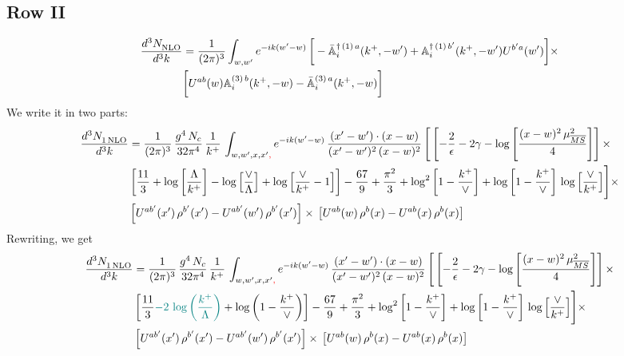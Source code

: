 \documentclass[9pt]{article}
\def\mf#1{\mathbb{#1}}
\numberwithin{equation}{section}
\begin{document}
\subsection{Row II}
\begin{align}
    \frac{d^{3}N_{\rm NLO}^{\rm}}{d^{3}k} &  = \frac{1}{(2\pi)^{3}}  \int_{w, w^\prime} e^{-ik(w^\prime-w)}\,\bigg[-\bar{\mf{A}}^{\dagger\,(1)\,a}_{i}(k^{+},-w^{\prime})+\mf{A}^{\dagger\, (1)\, b^{\prime}}_{i}(k^{+},-w^{\prime})U^{b^{\prime}a}(w^{\prime})\bigg]\times \notag \\ & \bigg[U^{ab}(w)\mf{A}^{(3)\, b}_{i}(k^{+},- w)-\Bar{\mf{A}}^{(3)\, a}_{i}(k^{+}, - w)\bigg]\nonumber
\end{align}
We write it in two parts: 
\begin{align}
     \frac{d^{3}N_{1\,\rm NLO}^{\rm}}{d^{3}k} &  = \frac{1}{(2\pi)^{3}}\, \frac{g^{4}\,N_{c}}{32\pi^{4}}\,\frac{1}{k^{+}}\, \int_{w, w',x,x'{\color{red},}} e^{-ik(w^\prime-w)}\, \frac{(x'-w')\cdot (x-w)}{(x'-w')^{2}\, (x-w)^{2}}\, \Bigg[\left[-\frac{2}{\epsilon}-2\gamma-\log{\left[\frac{(x-w)^{2}\,\mu^{2}_{\overline{MS}}}{4}\right]}\right]\times \notag \\ & \left[\frac{11}{3}+\log{\left[\frac{\Lambda}{k^{+}}\right]}-\log{\left[\frac{\vee}{\Lambda}\right]}+\log{\left[\frac{\vee}{k^{+}}-1\right]}\right]-\frac{67}{9}+\frac{\pi^{2}}{3}+\log^{2}{\left[1-\frac{k^{+}}{\vee}\right]}+\log{\left[1-\frac{k^{+}}{\vee}\right]}\,\log{\left[\frac{\vee}{k^{+}}\right]}\Bigg]\times\notag \\ & \left[U^{ab'}(x')\,\rho^{b'}(x') - U^{ab'}(w')\,\rho^{b'}(x')\right]\times\,\left[U^{ab}(w)\,\rho^{b}(x) - U^{ab}(x)\,\rho^{b}(x)\right]
\end{align}
Rewriting, we get
\begin{align}
     \frac{d^{3}N_{1\,\rm NLO}^{\rm}}{d^{3}k} &  = \frac{1}{(2\pi)^{3}}\, \frac{g^{4}\,N_{c}}{32\pi^{4}}\,\frac{1}{k^{+}}\, \int_{w, w',x,x'{\color{red},}} e^{-ik(w^\prime-w)}\, \frac{(x'-w')\cdot (x-w)}{(x'-w')^{2}\, (x-w)^{2}}\, \Bigg[\left[-\frac{2}{\epsilon}-2\gamma-\log{\left[\frac{(x-w)^{2}\,\mu^{2}_{\overline{MS}}}{4}\right]}\right]\times \notag \\ & \left[\frac{11}{3}{\color{teal}-2\,\log{\left(\frac{k^{+}}{\Lambda}\right)}}+\log{\left(1-\frac{k^{+}}{\vee}\right)}\right]-\frac{67}{9}+\frac{\pi^{2}}{3}+\log^{2}{\left[1-\frac{k^{+}}{\vee}\right]}+\log{\left[1-\frac{k^{+}}{\vee}\right]}\,\log{\left[\frac{\vee}{k^{+}}\right]}\Bigg]\times\notag \\ & \left[U^{ab'}(x')\,\rho^{b'}(x') - U^{ab'}(w')\,\rho^{b'}(x')\right]\times\,\left[U^{ab}(w)\,\rho^{b}(x) - U^{ab}(x)\,\rho^{b}(x)\right]
\end{align}
\end{document}
